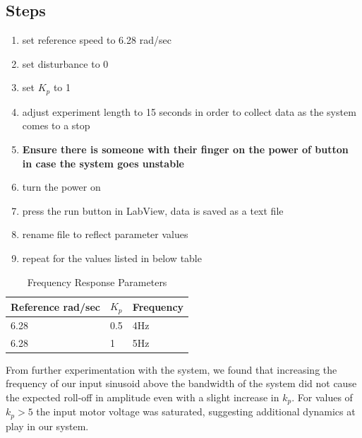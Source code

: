 \documentclass[11pt,titlepage]{article}
\begin{document}
    \subsection*{Steps}
        \begin{enumerate}
            \itemsep0em 
            \item set reference speed to 6.28 rad/sec
            \item set disturbance to 0
            \item set $K_p$ to 1
            \item adjust experiment length to 15 seconds in order to collect data as the system comes to a stop
            \item \textbf{Ensure there is someone with their finger on the power of button in case the system goes unstable}
            \item turn the power on
            \item press the run button in LabView, data is saved as a text file
            \item rename file to reflect parameter values
            \item repeat for the values listed in below table
        \end{enumerate}
        \begin{table}[h!]
            \centering
            \begin{tabular}{|m{4cm}|m{3cm}|m{3cm}|} 
                \hline
                Reference rad/sec & $K_p$ & Frequency \\ 
                \hline
                6.28 & 0.5 & 4Hz \\
                \hline
                6.28 & 1 & 5Hz\\
                \hline
            \end{tabular}
            \caption{Frequency Response Parameters} \label{table:freq_param}
        \end{table}
        From further experimentation with the system, we found that increasing the frequency of our input sinusoid above the bandwidth of the system did not cause the expected roll-off in amplitude even with a slight increase in $k_p$. For values of $k_p > 5$ the input motor voltage was saturated, suggesting additional dynamics at play in our system.
\end{document}
